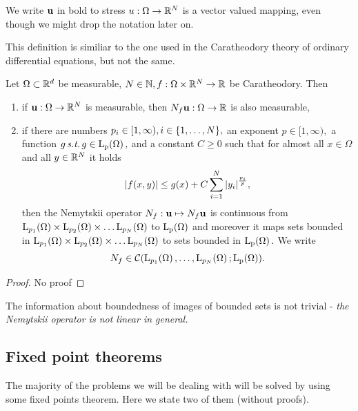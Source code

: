 \documentclass{article}
\begin{document}
\begin{remark}
    We write $\vb{u}$ in bold to stress $u: \Omega \to {\mathbb R}^{N}$ is a vector valued mapping, even though we might drop the notation later on.
\end{remark}

\begin{remark}
    This definition is similiar to the one used in the Caratheodory theory of ordinary differential equations, but not the same.
\end{remark}

\begin{theorem}
  Let $\Omega \subset {\mathbb R}^{d}$ be measurable, $N \in {\mathbb N}, f: \Omega \times {\mathbb R}^{N} \to {\mathbb R}$ be Caratheodory. Then

  \begin{enumerate}
	  \item if $\vb{u}: \Omega \to {\mathbb R}^{N}$ is measurable, then $N_f \vb{u}: \Omega \to {\mathbb R}$ is also measurable,
	  \item if there are numbers $p_i \in [1, \infty), i \in \qty{1, \dots, N},$ an exponent $p \in [1, \infty),$ a function $g \, \text{\textit{s.t.}} \, g \in \LpSet{\Omega},$ and a constant $C\geq 0$ such that for almost all $x \in \Omega$ and all $y \in {\mathbb R}^{N}$ it holds
		  \[
			  \abs{f(x,y)}\leq g(x) + C \sum_{i=1}^N\abs{y_i}^{\frac{p_i}{p}},
		  \]
		  then the Nemytskii operator $N_f: \vb{u} \mapsto N_f\vb{u}$ is continuous from $\LpSet[p_1]{\Omega} \times \LpSet[p_2]{\Omega} \times \dots \LpSet[p_N]{\Omega}$ to $\LpSet{\Omega}$ and moreover it maps sets bounded in $\LpSet[p_1]{\Omega} \times \LpSet[p_2]{\Omega} \times \dots \LpSet[p_N]{\Omega}$ to sets bounded in $\LpSet{\Omega}.$ We write
		  \[
			  N_f \in \mathcal{C}\qty(\LpSet[p_1]{\Omega}, \dots, \LpSet[p_N]{\Omega}; \LpSet{\Omega}).
		  \]
  \end{enumerate}
\end{theorem}

\begin{proof}
	No proof
\end{proof}

\begin{remark}
	The information about boundedness of images of bounded sets is not trivial - \textit{the Nemytskii operator is not linear in general.}
\end{remark}

\subsection{Fixed point theorems}
\label{sec:fixed_points}
The majority of the problems we will be dealing with will be solved by using some fixed points theorem. Here we state two of them (without proofs).
\end{document}
